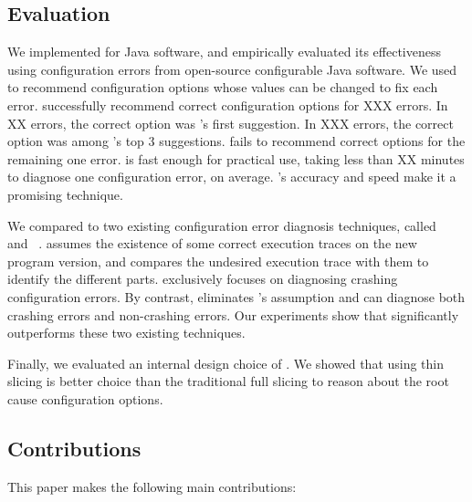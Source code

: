\subsection{Evaluation}

We implemented \ourtool for Java software, and empirically evaluated
its effectiveness using \errornum configuration errors
from \subjnum open-source configurable Java software. 
We used \ourtool to recommend configuration options whose values
can be changed to fix each error.
\ourtool successfully recommend correct configuration options
for XXX errors. In XX errors, the correct option was \ourtool's first
suggestion. In XXX errors, the correct option was among
\ourtool's top 3 suggestions. 
\ourtool fails to recommend correct options for the remaining
one error. \ourtool is fast enough for practical use,
taking less than XX minutes to diagnose one configuration error, on average.
\ourtool's accuracy and speed make it a promising technique.


We compared \ourtool to two existing configuration error diagnosis
techniques, called \prevtool~\cite{Zhang:2013:ADS}
and \conftool~\cite{Rabkin:2011:PPC}.
\prevtool assumes the existence of some correct execution traces
on the new program version, and compares the undesired execution
trace with them to identify the different parts. \conftool exclusively
focuses on diagnosing crashing configuration errors.
By contrast, \ourtool eliminates \prevtool's assumption and
can diagnose both crashing errors and non-crashing errors. Our experiments
show that \ourtool significantly outperforms these two existing techniques.

Finally, we evaluated an internal design choice of \ourtool. We showed
that using thin slicing is better choice than the traditional full
slicing to reason about the root cause configuration options.


\subsection{Contributions}

This paper makes the following main contributions:

